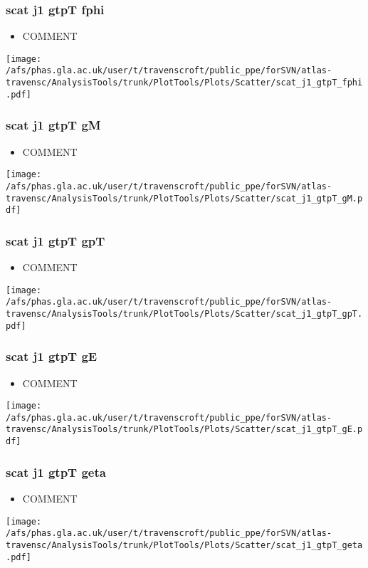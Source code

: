 \documentclass{beamer}
\begin{document}
\begin{frame}
\frametitle{scat j1 gtpT fphi}
\begin{itemize}
\item COMMENT
\end{itemize}
\begin{center}
\texttt{[image: /afs/phas.gla.ac.uk/user/t/travenscroft/public\_ppe/forSVN/atlas-travensc/AnalysisTools/trunk/PlotTools/Plots/Scatter/scat\_j1\_gtpT\_fphi.pdf]}
\end{center}
\end{frame}

\begin{frame}
\frametitle{scat j1 gtpT gM}
\begin{itemize}
\item COMMENT
\end{itemize}
\begin{center}
\texttt{[image: /afs/phas.gla.ac.uk/user/t/travenscroft/public\_ppe/forSVN/atlas-travensc/AnalysisTools/trunk/PlotTools/Plots/Scatter/scat\_j1\_gtpT\_gM.pdf]}
\end{center}
\end{frame}

\begin{frame}
\frametitle{scat j1 gtpT gpT}
\begin{itemize}
\item COMMENT
\end{itemize}
\begin{center}
\texttt{[image: /afs/phas.gla.ac.uk/user/t/travenscroft/public\_ppe/forSVN/atlas-travensc/AnalysisTools/trunk/PlotTools/Plots/Scatter/scat\_j1\_gtpT\_gpT.pdf]}
\end{center}
\end{frame}

\begin{frame}
\frametitle{scat j1 gtpT gE}
\begin{itemize}
\item COMMENT
\end{itemize}
\begin{center}
\texttt{[image: /afs/phas.gla.ac.uk/user/t/travenscroft/public\_ppe/forSVN/atlas-travensc/AnalysisTools/trunk/PlotTools/Plots/Scatter/scat\_j1\_gtpT\_gE.pdf]}
\end{center}
\end{frame}

\begin{frame}
\frametitle{scat j1 gtpT geta}
\begin{itemize}
\item COMMENT
\end{itemize}
\begin{center}
\texttt{[image: /afs/phas.gla.ac.uk/user/t/travenscroft/public\_ppe/forSVN/atlas-travensc/AnalysisTools/trunk/PlotTools/Plots/Scatter/scat\_j1\_gtpT\_geta.pdf]}
\end{center}
\end{frame}
\end{document}

